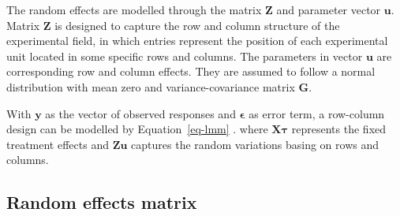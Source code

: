 \documentclass[
  a4paper,
  oneside,
  openany,
  12pt,
  onecolumn]{book}
\theoremstyle{definition}
\theoremstyle{definition}
\theoremstyle{plain}
\theoremstyle{remark}
\begin{document}
The random effects are modelled through the matrix \(\boldsymbol{Z}\)
and parameter vector \(\boldsymbol{u}\). Matrix \(\boldsymbol{Z}\) is
designed to capture the row and column structure of the experimental
field, in which entries represent the position of each experimental unit
located in some specific rows and columns. The parameters in vector
\(\boldsymbol{u}\) are corresponding row and column effects. They are
assumed to follow a normal distribution with mean zero and
variance-covariance matrix \(\boldsymbol{G}\).

With \(\boldsymbol{y}\) as the vector of observed responses and
\(\boldsymbol{\epsilon}\) as error term, a row-column design can be
modelled by Equation~\ref{eq-lmm} . where \(\boldsymbol{X\tau}\)
represents the fixed treatment effects and \(\boldsymbol{Zu}\) captures
the random variations basing on rows and columns.

\subsection{Random effects matrix}\label{random-effects-matrix}
\end{document}
